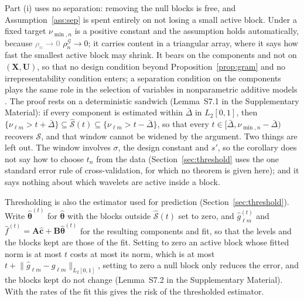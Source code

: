 \documentclass[12pt]{article} %
\theoremstyle{definition}
\theoremstyle{plain}
\newcommand{\cv}{\ell}
\newcommand{\md}{m}
\newcommand{\bX}{\mathbf{X}}
\newcommand{\bU}{\mathbf{U}}
\newcommand{\gcomp}[2]{g_{#1#2}}
\newcommand{\btheta}{\boldsymbol{\theta}}
\newcommand{\thetahat}{\widehat{\btheta}}
\newcommand{\chat}{\widehat{\mathbf{c}}}
\newcommand{\seff}{s'}
\newcommand{\Amat}{\mathbf{A}}
\newcommand{\Bmat}{\mathbf{B}}
\newcommand{\rhoG}{\rho^{\mathcal{G}}_{n}}
\begin{document}
{Part (i) uses no separation: removing the null blocks is free, and
Assumption~\ref{ass:sep} is spent entirely on not losing a small active block.
Under a fixed target $\nu_{\min,n}$ is a positive constant and the assumption holds
automatically, because \textcolor{gray}{\sout{$\rho_n \to 0$}} $\rhoG \to 0$; it carries content in a triangular
array, where it says how fast the smallest active block may shrink. It bears
on the components and not on $(\bX,\bU)$, so that no design condition beyond
Proposition~\ref{prop:gram} and no irrepresentability condition enters; a
separation condition on the components plays the same role in the selection
of variables in nonparametric additive models \citep{Huang-Horowitz-Wei-2010}.
The proof rests on a deterministic sandwich (Lemma~S7.1 in the Supplementary
Material): if every component is estimated within $\bar{\Delta}$ in $L_2[0,1]$, then
$\{\nu_{\cv\md} > t + \bar{\Delta}\} \subseteq \widehat{\mathcal{S}}(t) \subseteq
\{\nu_{\cv\md} > t - \bar{\Delta}\}$, so that every $t \in [\bar{\Delta}, \nu_{\min,n} - \bar{\Delta})$ recovers $\mathcal{S}$,
and that window cannot be widened by the argument. Two things are left out.
The window involves $\sigma$, the design constant and $\seff$, so the
corollary does not say how to choose $t_n$ from the data \textcolor{colR1}{(Section~\ref{sec:threshold}
uses the one standard error rule of cross-validation, for which no theorem is
given here)}; and it says nothing
about which wavelets are active inside a block.

Thresholding is also the estimator used for prediction
(Section~\ref{sec:threshold}). Write $\thetahat^{(t)}$ for $\thetahat$ with the
blocks outside $\widehat{\mathcal{S}}(t)$ set to zero, and
$\widehat{g}^{(t)}_{\cv\md}$ and $\widehat{f}^{(t)} = \Amat\chat +
\Bmat\thetahat^{(t)}$ for the resulting components and fit, so that the levels
and the blocks kept are those of the fit. Setting to zero an active block
whose fitted norm is at most $t$ costs at most its norm, which is at most
$t + \lVert\widehat{g}_{\cv\md} - \gcomp{\cv}{\md}\rVert_{L_2[0,1]}$, setting to
zero a null block only reduces the error, and the blocks kept do not change
(Lemma~S7.2 in the Supplementary Material). With the rates of the fit this
gives the risk of the thresholded estimator.

}
\end{document}
